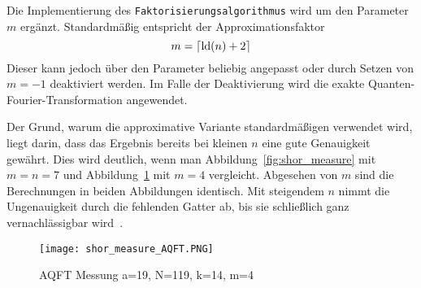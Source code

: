 Die Implementierung des \texttt{Faktorisierungsalgorithmus} wird um den Parameter \(m\) ergänzt.
Standardmäßig entspricht der Approximationsfaktor 
\[m = \lceil\operatorname{ld}(n)+2\rceil\]  
Dieser kann jedoch über den Parameter beliebig angepasst oder 
durch Setzen von \(m=-1\) deaktiviert werden.
Im Falle der Deaktivierung wird die exakte Quanten-Fourier-Transformation angewendet.

Der Grund, warum die approximative Variante standardmäßigen verwendet wird, 
liegt darin, dass das Ergebnis bereits bei kleinen \(n\) eine gute Genauigkeit gewährt. 
Dies wird deutlich, wenn man Abbildung~\ref{fig:shor_measure} mit \(m=n=7\) und
Abbildung~\ref{fig:shor_measure_AQFT} mit \(m=4\) vergleicht.
Abgesehen von \(m\) sind die Berechnungen in beiden Abbildungen identisch.
Mit steigendem \(n\) nimmt die Ungenauigkeit durch die fehlenden Gatter ab, 
bis sie schließlich ganz vernachlässigbar wird~\cite{cheung2004improved}.

\begin{figure}[H]
  \centering
  \texttt{[image: shor\_measure\_AQFT.PNG]}
  \caption{AQFT Messung a=19, N=119, k=14, m=4}
  \label{fig:shor_measure_AQFT}
\end{figure}
